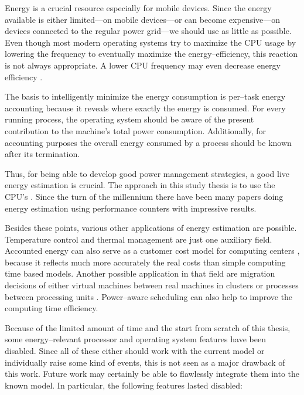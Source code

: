 
Energy is a crucial resource especially for mobile devices. Since the energy
available is either limited---on mobile devices---or can become expensive---on
devices connected to the regular power grid---we should use as little as
possible. Even though most modern operating systems try to maximize the CPU
usage by lowering the frequency \cite{snowdon2010operating} to eventually
maximize the energy--efficiency, this reaction is not always appropriate. A
lower CPU frequency may even decrease energy efficiency
\cite{weissel2002process,snowdon2010operating}.

The basis to intelligently minimize the energy consumption is per--task energy
accounting because it reveals where exactly the energy is consumed.
For every running process, the operating system should be aware of the present
contribution to the machine's total power consumption. Additionally, for
accounting purposes the overall energy consumed by a process should be known
after its termination.

Thus, for being able to develop good power management strategies, a good live
energy estimation is crucial. The approach in this study thesis is to use the
CPU's . Since the turn of the millennium
\cite{bellosa2000benefits} there have been many papers
\cite{Bertran2010,bertran2010decomposable,kellner03tempcontrol,isci2003runtime,
weissel2002process} doing energy estimation using performance counters with
impressive results.

Besides these points, various other applications of energy estimation are
possible. Temperature control \cite{kellner03tempcontrol} and thermal management
\cite{merkel05tmsmpsys} are just one auxiliary field. Accounted energy can also
serve as a customer cost model for computing centers \cite{Bertran2010}, because
it reflects much more accurately the real costs than simple computing time based
models. Another possible application in that field are migration decisions of
either virtual machines between real machines in clusters or processes between
processing units \cite{merkel10rcscheduling}. Power--aware scheduling can also
help to improve the computing time efficiency.


\label{sec:restrictions}

Because of the limited amount of time and the start from scratch of this thesis,
some energy--relevant processor and operating system features have been
disabled.  Since all of these either should work with the current model or
individually raise some kind of events, this is not seen as a major drawback of
this work. Future work may certainly be able to flawlessly integrate them into
the known model. In particular, the following features lasted disabled:

